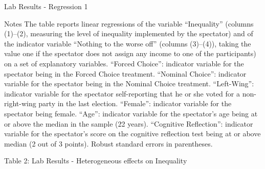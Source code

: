 \documentclass{beamer}
\begin{document}
	\begin{frame}{Lab Results - Regression 1}

		\begin{block}{Notes}
			The table reports linear regressions of the variable ``Inequality''
			(columns (1)–(2), measuring the level of inequality implemented by
			the spectator) and of the indicator variable “Nothing to the worse off”
			(columns (3)–(4)), taking the value one if the spectator does not assign
			any income to one of the participants) on a set of explanatory variables.
			“Forced Choice”: indicator variable for the spectator being in the Forced
			Choice treatment. “Nominal Choice”: indicator variable for the spectator
			being in the Nominal Choice treatment. “Left-Wing”: indicator variable
			for the spectator self-reporting that he or she voted for a non-right-wing
			party in the last election. “Female”: indicator variable for the spectator
			being female. “Age”: indicator variable for the spectator’s age being at
			or above the median in the sample (22 years). “Cognitive Reflection”:
			indicator variable for the spectator’s score on the cognitive reflection test
			being at or above median (2 out of 3 points). Robust standard errors in
			parentheses.
		\end{block}
	\end{frame}

	\begin{frame}{Table 2: Lab Results - Heterogeneous effects on Inequality}{\tiny
		
	}  %
\end{frame}
\end{document}
